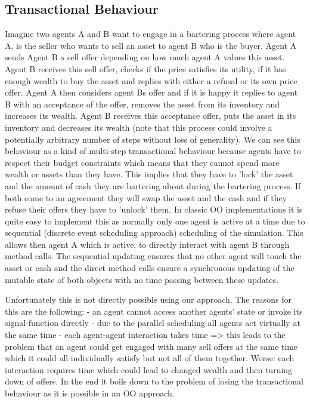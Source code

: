\subsection{Transactional Behaviour}
Imagine two agents A and B want to engage in a bartering process where agent A, is the seller who wants to sell an asset to agent B who is the buyer. Agent A sends Agent B a sell offer depending on how much agent A values this asset. Agent B receives this sell offer, checks if the price satisfies its utility, if it has enough wealth to buy the asset and replies with either a refusal or its own price offer. Agent A then considers agent Bs offer and if it is happy it replies to agent B with an acceptance of the offer, removes the asset from its inventory and increases its wealth. Agent B receives this acceptance offer, puts the asset in its inventory and decreases its wealth (note that this process could involve a potentially arbitrary number of steps without loss of generality).
We can see this behaviour as a kind of multi-step transactional behaviour because agents have to respect their budget constraints which means that they cannot spend more wealth or assets than they have. This implies that they have to 'lock' the asset and the amount of cash they are bartering about during the bartering process. If both come to an agreement they will swap the asset and the cash and if they refuse their offers they have to 'unlock' them.
In classic OO implementations it is quite easy to implement this as normally only one agent is active at a time due to sequential (discrete event scheduling approach) scheduling of the simulation. This allows then agent A which is active, to directly interact with agent B through method calls. The sequential updating ensures that no other agent will touch the asset or cash and the direct method calls ensure a synchronous updating of the mutable state of both objects with no time passing between these updates.

Unfortunately this is not directly possible using our approach. The reasons for this are the following:
- an agent cannot access another agents' state or invoke its signal-function directly
- due to the parallel scheduling all agents act virtually at the same time 
- each agent-agent interaction takes time 
=> this leads to the problem that an agent could get engaged with many sell offers at the same time which it could all individually satisfy but not all of them together. Worse: each interaction requires time which could lead to changed wealth and then turning down of offers. In the end it boils down to the problem of losing the transactional behaviour as it is possible in an OO approach.

